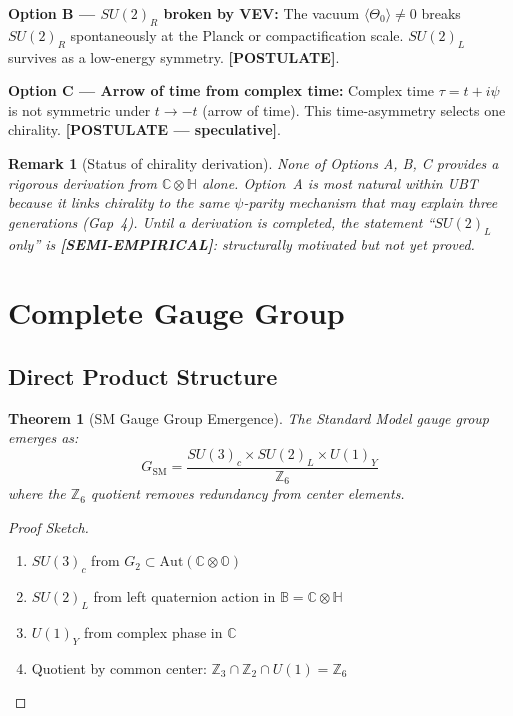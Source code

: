 \documentclass[12pt]{article}
\newtheorem{theorem}[definition]{Theorem}
\newtheorem{remark}[definition]{Remark}
\newcommand{\B}{\mathbb{B}}
\newcommand{\C}{\mathbb{C}}
\renewcommand{\H}{\mathbb{H}}
\renewcommand{\O}{\mathbb{O}}
\newcommand{\Aut}{\mathrm{Aut}}
\begin{document}
\textbf{Option B --- $SU(2)_R$ broken by VEV:}
The vacuum $\langle\Theta_0\rangle \neq 0$ breaks $SU(2)_R$ spontaneously at the
Planck or compactification scale.  $SU(2)_L$ survives as a low-energy symmetry.
\textbf{[POSTULATE]}.

\textbf{Option C --- Arrow of time from complex time:}
Complex time $\tau = t + i\psi$ is not symmetric under $t \to -t$ (arrow of time).
This time-asymmetry selects one chirality.
\textbf{[POSTULATE --- speculative]}.

\begin{remark}[Status of chirality derivation]
\label{rem:chirality_status}
None of Options A, B, C provides a rigorous derivation from $\C\otimes\H$ alone.
Option~A is most natural within UBT because it links chirality to the same
$\psi$-parity mechanism that may explain three generations (Gap~4).
Until a derivation is completed, the statement ``$SU(2)_L$ only'' is
\textbf{[SEMI-EMPIRICAL]}: structurally motivated but not yet proved.
\end{remark}

\section{Complete Gauge Group}

\subsection{Direct Product Structure}

\begin{theorem}[SM Gauge Group Emergence]
The Standard Model gauge group emerges as:
\begin{equation}
G_{\mathrm{SM}} = \frac{SU(3)_c \times SU(2)_L \times U(1)_Y}{\mathbb{Z}_6}
\end{equation}
where the $\mathbb{Z}_6$ quotient removes redundancy from center elements.
\end{theorem}

\begin{proof}[Proof Sketch]
\begin{enumerate}
\item $SU(3)_c$ from $G_2 \subset \Aut(\C \otimes \O)$
\item $SU(2)_L$ from left quaternion action in $\B = \C \otimes \H$
\item $U(1)_Y$ from complex phase in $\C$
\item Quotient by common center: $\mathbb{Z}_3 \cap \mathbb{Z}_2 \cap U(1) = \mathbb{Z}_6$
\end{enumerate}
\end{proof}
\end{document}
